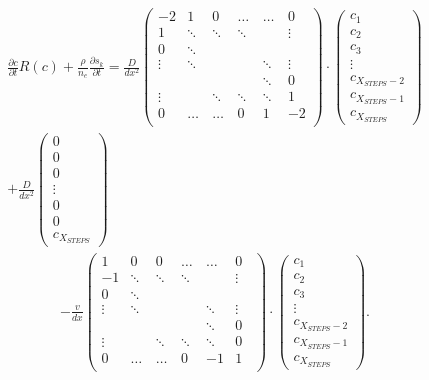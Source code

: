 \begin{align*}
    \frac{\partial c}{\partial t} R(c) + \frac{\rho}{n_e}\frac{\partial s_k}{\partial t} = \frac{D}{dx^2} \begin{pmatrix} 
    -2 & 1 & 0 & \dots & \hdots & 0\\
    1 & \ddots & \ddots & \ddots & \quad & \vdots\\
    0 & \ddots & \quad & \quad &\quad & \quad\\
    \vdots & \ddots & \quad &\quad&\ddots&\vdots\\
    \quad&\quad&\quad&\quad&\ddots&0\\
    \vdots&\quad&\ddots&\ddots&\ddots&1\\
    0&\hdots&\dots&0&1&-2\\
    \end{pmatrix}
    \cdot
    \begin{pmatrix}
    c_1\\
    c_2\\
    c_3\\
    \vdots\\
    c_{X_{STEPS}-2}\\
    c_{X_{STEPS}-1}\\
    c_{X_{STEPS}}
    \end{pmatrix}
    \nonumber\\
    +\frac{D}{dx^2}
    \begin{pmatrix}
    0\\
    0\\
    0\\
    \vdots\\
    0\\
    0\\
    c_{X_{STEPS}}
    \end{pmatrix}
\end{align*}
\begin{align}
    -\frac{v}{dx}
    \begin{pmatrix} 
    1 & 0 & 0 & \dots & \hdots & 0\\
    -1 & \ddots & \ddots & \ddots & \quad & \vdots\\
    0 & \ddots & \quad & \quad &\quad & \quad\\
    \vdots & \ddots & \quad &\quad&\ddots&\vdots\\
    \quad&\quad&\quad&\quad&\ddots&0\\
    \vdots&\quad&\ddots&\ddots&\ddots&0\\
    0&\hdots&\dots&0&-1&1\\
    \end{pmatrix}
        \cdot
    \begin{pmatrix}
    c_1\\
    c_2\\
    c_3\\
    \vdots\\
    c_{X_{STEPS}-2}\\
    c_{X_{STEPS}-1}\\
    c_{X_{STEPS}}
    \end{pmatrix}.
\end{align}
